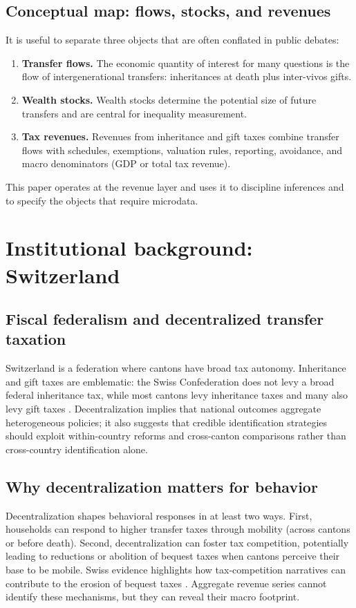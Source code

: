 \documentclass[11pt,a4paper]{article}
\begin{document}
\subsection{Conceptual map: flows, stocks, and revenues}
It is useful to separate three objects that are often conflated in public debates:
\begin{enumerate}
  \item \textbf{Transfer flows.} The economic quantity of interest for many questions is the flow of intergenerational transfers: inheritances at death plus inter-vivos gifts.
  \item \textbf{Wealth stocks.} Wealth stocks determine the potential size of future transfers and are central for inequality measurement.
  \item \textbf{Tax revenues.} Revenues from inheritance and gift taxes combine transfer flows with schedules, exemptions, valuation rules, reporting, avoidance, and macro denominators (GDP or total tax revenue).
\end{enumerate}
This paper operates at the revenue layer and uses it to discipline inferences and to specify the objects that require microdata.

\section{Institutional background: Switzerland}
\label{sec:institution}

\subsection{Fiscal federalism and decentralized transfer taxation}
Switzerland is a federation where cantons have broad tax autonomy. Inheritance and gift taxes are emblematic: the Swiss Confederation does not levy a broad federal inheritance tax, while most cantons levy inheritance taxes and many also levy gift taxes \parencite{EFDJUSO2024}. Decentralization implies that national outcomes aggregate heterogeneous policies; it also suggests that credible identification strategies should exploit within-country reforms and cross-canton comparisons rather than cross-country identification alone.

\subsection{Why decentralization matters for behavior}
Decentralization shapes behavioral responses in at least two ways. First, households can respond to higher transfer taxes through mobility (across cantons or before death). Second, decentralization can foster tax competition, potentially leading to reductions or abolition of bequest taxes when cantons perceive their base to be mobile. Swiss evidence highlights how tax-competition narratives can contribute to the erosion of bequest taxes \parencite{BrulhartParchet2014}. Aggregate revenue series cannot identify these mechanisms, but they can reveal their macro footprint.
\end{document}
